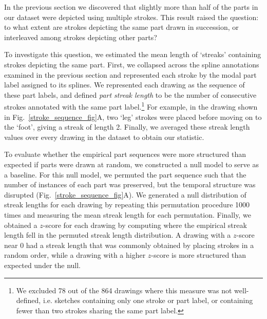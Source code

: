 \documentclass[10pt,letterpaper]{article}
\begin{document}
In the previous section we discovered that slightly more than half of the parts in our dataset were depicted using multiple strokes. This result raised the question: to what extent are strokes depicting the same part drawn in succession, or interleaved among strokes depicting other parts?


To investigate this question, we estimated the mean length of `streaks' containing strokes depicting the same part.
First, we collapsed across the spline annotations examined in the previous section and represented each stroke by the modal part label assigned to its splines.
We represented each drawing as the sequence of these part labels, and defined \textit{part streak length} to be the number of consecutive strokes annotated with the same part label.\footnote{We excluded 78 out of the 864 drawings where this measure was not well-defined, i.e. sketches containing only one stroke or part label, or containing fewer than two strokes sharing the same part label.}
For example, in the drawing shown in Fig.~\ref{stroke_sequence_fig}A, two `leg' strokes were placed before moving on to the `foot', giving a streak of length 2.
Finally, we averaged these streak length values over every drawing in the dataset to obtain our statistic. 

To evaluate whether the empirical part sequences were more structured than expected if parts were drawn at random, we constructed a null model to serve as a baseline.
For this null model, we permuted the part sequence such that the number of instances of each part was preserved, but the temporal structure was disrupted (Fig.~\ref{stroke_sequence_fig}A).
We generated a null distribution of streak lengths for each drawing by repeating this permutation procedure 1000 times and measuring the mean streak length for each permutation.
Finally, we obtained a $z$-score for each drawing by computing where the empirical streak length fell in the permuted streak length distribution.
A drawing with a $z$-score near 0 had a streak length that was commonly obtained by placing strokes in a random order, while a drawing with a higher $z$-score is more structured than expected under the null.
\end{document}
